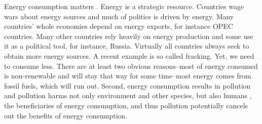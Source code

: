 \documentclass[10pt, letterpaper]{article}
\begin{document}
\begin{spacing}{1.4}

Energy consumption matters%
. Energy is a strategic
resource. Countries wage wars about energy sources  and much of politics is
driven by energy. Many countries' whole economies depend on energy exports, for instance OPEC countries. Many other countries rely heavily on energy production
and some use it as a political tool, for instance, Russia.   
Virtually all countries  always seek to obtain more energy sources. A recent example is so called
fracking. Yet, we need to consume less. There are at least two
obvious reasons--most of energy consumed  is non-renewable and will stay
that way for some time\cite{mackay08}--most energy comes from
fossil fuels, which will run out. %
Second, energy consumption results in pollution and pollution harms not only
 environment and other species, but also  humans \cite{mackerron09,gandelman12,ferreira13}, the beneficiaries of energy
consumption, and thus pollution potentially cancels out the benefits of energy
consumption. 
 

\end{spacing}
\end{document}

